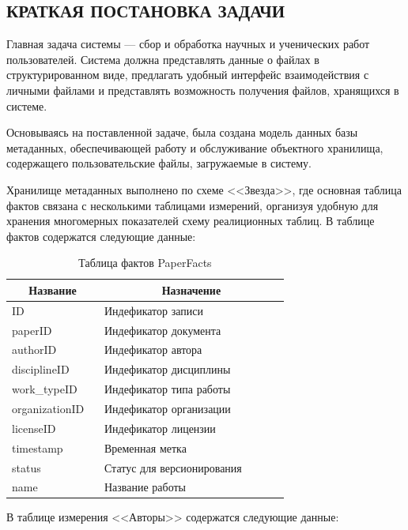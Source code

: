 \documentclass[a4paper,14pt]{extarticle}
\newcommand{\heading}[1]{\multicolumn{1}{|c|}{\textbf{#1}}}
\begin{document}
\subsection{КРАТКАЯ ПОСТАНОВКА ЗАДАЧИ}
Главная задача системы --- сбор и обработка научных и ученических работ пользователей. Система должна представлять данные о файлах в структурированном виде, предлагать удобный интерфейс взаимодействия с личными файлами и представлять возможность получения файлов, хранящихся в системе.

Основываясь на поставленной задаче, была создана модель данных базы метаданных, обеспечивающей работу и обслуживание объектного хранилища, содержащего пользовательские файлы, загружаемые в систему.

Хранилище метаданных выполнено по схеме <<Звезда>>, где основная таблица фактов связана с несколькими таблицами измерений, организуя удобную для хранения многомерных показателей схему реалиционных таблиц.
В таблице фактов содержатся следующие данные:

\begin{table}[h!]
	\caption{Таблица фактов PaperFacts}
	\begin{tabular}{|p{0.3\linewidth}|p{0.6\linewidth}|}
		\hline
		\heading{Название} & \heading{Назначение} \\ \hline
		ID & Индефикатор записи \\ \hline
		paperID & Индефикатор документа \\ \hline
		authorID & Индефикатор автора \\ \hline
		disciplineID & Индефикатор дисциплины  \\ \hline
		work\_typeID & Индефикатор типа работы \\ \hline
		organizationID & Индефикатор организации \\ \hline
		licenseID & Индефикатор лицензии \\ \hline
		timestamp & Временная метка \\ \hline
		status & Статус для версионирования \\ \hline
		name & Название работы \\ \hline
	\end{tabular}
	\label{tab:facts}
\end{table}

В таблице измерения <<Авторы>> содержатся следующие данные:
\end{document}

